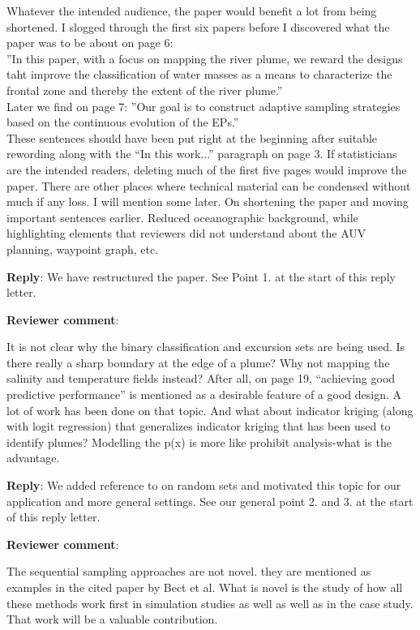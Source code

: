 \documentclass[a4paper]{article}
\newcounter{reviewer}
\def\revcom{\textbf{Reviewer comment}}
\def\reply{\textbf{Reply}}
\begin{document}
\begin{answers}
Whatever the intended audience, the paper would benefit a lot from being shortened. I slogged through the first six papers before I discovered what the paper was to be about on page 6:\\
”In this paper, with a focus on mapping the river plume, we reward the designs taht improve the classification of water masses as a means to characterize the frontal zone and thereby the extent of the river plume.”\\
Later we find on page 7:
”Our goal is to construct adaptive sampling strategies based on the continuous evolution of the EPs.”\\
These sentences should have been put right at the beginning after suitable rewording along with the “In this work...” paragraph on page 3. If statisticians are the intended readers, deleting much of the first five pages would improve the paper. There are other places where technical material can be condensed without much if any loss. I will mention some later.
On shortening the paper and moving important sentences earlier. Reduced oceanographic background, while highlighting elements that reviewers did not understand about the AUV planning, waypoint graph, etc.

\reply: We have restructured the paper. See Point 1. at the start of this reply letter. 

\item{\revcom :}\label{r1c6}

It is not clear why the binary classification and excursion sets are being used. Is there really a sharp boundary at the edge of a plume? Why not mapping the salinity and temperature fields instead? After all, on page 19, “achieving good predictive performance” is mentioned as a desirable feature of a good design. A lot of work has been done on that topic. And what about indicator kriging (along with logit regression) that generalizes indicator kriging that has been used to identify plumes? Modelling the p(x) is more like prohibit analysis-what is the advantage.

\reply: We added reference to \cite{adler2009random} on random sets and motivated this topic for our application and more general settings. See our general point 2. and 3. at the start of this reply letter. 

\item{\revcom :}\label{r1c7}

 The sequential sampling approaches are not novel. they are mentioned as examples in the cited paper by Bect et al. What is novel is the study of how all these methods work first in simulation studies as well as well as in the case study. That work will be a valuable contribution.


\end{answers}
\end{document}
